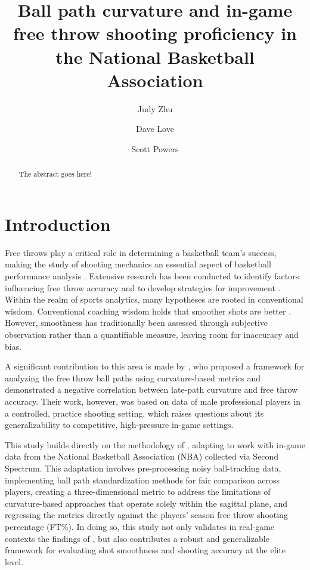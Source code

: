\documentclass{article}
\title{Ball path curvature and in-game free throw shooting proficiency in the National Basketball Association}
\author[1]{Judy Zhu}
\author[2]{Dave Love}
\author[3]{Scott Powers}
\affil[1]{Department of Mathematics, Rice University}
\affil[2]{CDL Basketball Enterprises}
\affil[3]{Department of Sport Management, Rice University}
\begin{document}
  \maketitle

  \begin{abstract}
    The abstract goes here!
  \end{abstract}

  \section{Introduction}

    Free throws play a critical role in determining a basketball team's success, making the study of shooting mechanics an essential aspect of basketball performance analysis \citep{kozar_importance_1994}. Extensive research has been conducted to identify factors influencing free throw accuracy and to develop strategies for improvement \citep{tran_optimal_2008}. Within the realm of sports analytics, many hypotheses are rooted in conventional wisdom. Conventional coaching wisdom holds that smoother shots are better \citep{haefner_7_2010, penny_overlooked_2016}. However, smoothness has traditionally been assessed through subjective observation rather than a quantifiable measure, leaving room for inaccuracy and bias. 
    
    A significant contribution to this area is made by \citet{slegers_role_2024}, who proposed a framework for analyzing the free throw ball paths using curvature-based metrics and demonstrated a negative correlation between late-path curvature and free throw accuracy. Their work, however, was based on data of male professional  players in a controlled, practice shooting setting, which raises questions about its generalizability to competitive, high-pressure in-game settings. 

    This study builds directly on the methodology of \citet{slegers_role_2024}, adapting to work with in-game data from the National Basketball Association (NBA) collected via Second Spectrum. This adaptation involves pre-processing noisy ball-tracking data, implementing ball path standardization methods for fair comparison across players, creating a  three-dimensional metric to address the limitations of curvature-based approaches that operate solely within the sagittal plane, and regressing the metrics directly against the players' season free throw shooting percentage (FT\%). In doing so, this study not only validates in real-game contexts the findings of \citet{slegers_role_2024}, but also contributes a robust and generalizable framework for evaluating shot smoothness and shooting accuracy at the elite level.
\end{document}
